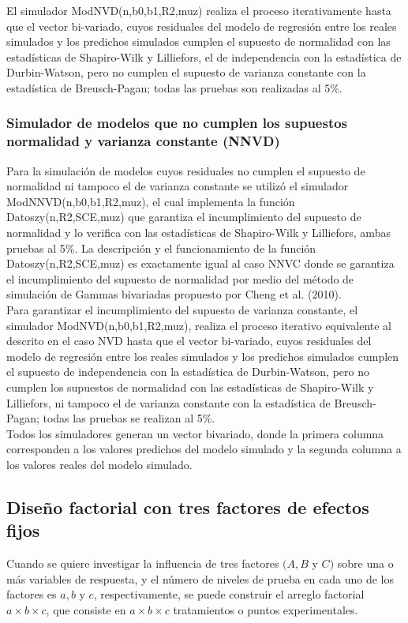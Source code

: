 El simulador ModNVD(n,b0,b1,R2,muz) realiza el proceso iterativamente hasta que el vector bi-variado, cuyos residuales del modelo de regresión entre los reales simulados y los predichos simulados cumplen el supuesto de normalidad con las estadísticas de Shapiro-Wilk y Lilliefors, el de independencia con la estadística de Durbin-Watson, pero no cumplen el supuesto de varianza constante con la estadística de Breusch-Pagan; todas las pruebas son realizadas al 5\%. 

\subsubsection{Simulador de modelos que no cumplen los supuestos normalidad y varianza constante (NNVD)}

Para la simulación de modelos cuyos residuales no cumplen el supuesto de normalidad ni tampoco el de varianza constante se utilizó el simulador ModNNVD(n,b0,b1,R2,muz), el cual implementa la función Datoszy(n,R2,SCE,muz) que garantiza el incumplimiento del supuesto de normalidad y lo verifica con las estadísticas de Shapiro-Wilk y Lilliefors, ambas pruebas al 5\%. La descripción y el funcionamiento de la función Datoszy(n,R2,SCE,muz) es exactamente igual al caso NNVC donde se garantiza el incumplimiento del supuesto de normalidad por medio del método de simulación de Gammas bivariadas propuesto por Cheng et al. (2010).\\


Para garantizar el incumplimiento del supuesto de varianza constante, el simulador ModNVD(n,b0,b1,R2,muz), realiza el proceso iterativo equivalente al descrito en el caso NVD hasta que el vector bi-variado, cuyos residuales del modelo de regresión entre los reales simulados y los predichos simulados cumplen el supuesto de independencia con la estadística de Durbin-Watson, pero no cumplen los supuestos de normalidad con las estadísticas de Shapiro-Wilk y Lilliefors, ni tampoco el de varianza constante con la estadística de Breusch-Pagan; todas las pruebas se realizan al 5\%.\\ 


Todos los simuladores generan un vector bivariado, donde la primera columna corresponden a los valores predichos del modelo simulado y la segunda columna a los valores reales del modelo simulado.\\

\subsection{Diseño factorial con tres factores de efectos fijos}
Cuando se quiere investigar la influencia de tres factores $(A, B$ y $C)$ sobre una o más variables de respuesta, y el número de niveles de prueba en cada uno de los factores es $a, b$ y $c$, respectivamente, se puede construir el arreglo factorial $a \times b \times c$, que consiste en $a \times b \times c$ tratamientos o puntos experimentales.
\vspace{.5cm}

